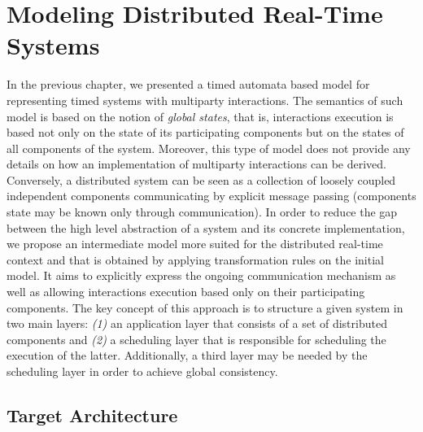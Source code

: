 \chapter{Modeling Distributed Real-Time Systems}\label{chap:3} 
\minitoc
In the previous chapter, we presented a timed automata based model for representing 
timed systems with multiparty interactions. The semantics of such model is based on 
the notion of \emph{global states}, that is, interactions execution is based not only on the 
state of its participating components but on the states of all components of the system.
Moreover, this type of model does not provide any details on how an implementation of 
multiparty interactions can be derived.
Conversely, a distributed system can be seen as a collection of loosely coupled independent
components communicating by explicit message passing (components state may be known only
through communication). 
In order to reduce the gap between the high level abstraction of a system and its concrete
implementation, we propose an intermediate model more suited for the distributed real-time
context and that is obtained by applying transformation rules on the initial model. 
It aims to explicitly express the ongoing communication mechanism as well as 
allowing interactions execution based only on their participating components.
The key concept of this approach is to structure a given system in two main layers: \emph{(1)}
an application layer that consists of a set of distributed components and \emph{(2)} a 
scheduling layer that is responsible for scheduling the execution of the latter. Additionally, 
a third layer may be needed by the scheduling layer in order to achieve global consistency.
\section{Target Architecture}

